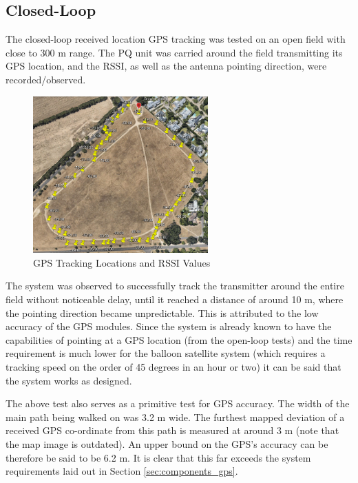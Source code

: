 \subsection{Closed-Loop}\label{sec:closed_loop_testing}
The closed-loop received location GPS tracking was tested on an open field with close to 300 m range. The PQ unit was carried around the field transmitting its GPS location, and the RSSI, as well as the antenna pointing direction, were recorded/observed.

\begin{figure}[!htb]
  \centering
  \includegraphics[width=0.6\textwidth]{gpsTrackingMap}
  \caption{GPS Tracking Locations and RSSI Values}
  \label{fig:gpsTrackingMap}
\end{figure}

The system was observed to successfully track the transmitter around the entire field without noticeable delay, until it reached a distance of around 10 m, where the pointing direction became unpredictable. This is attributed to the low accuracy of the GPS modules. Since the system is already known to have the capabilities of pointing at a GPS location (from the open-loop tests) and the time requirement is much lower for the balloon satellite system (which requires a tracking speed on the order of 45 degrees in an hour or two) it can be said that the system works as designed.

The above test also serves as a primitive test for GPS accuracy. The width of the main path being walked on was 3.2 m wide. The furthest mapped deviation of a received GPS co-ordinate from this path is measured at around 3 m (note that the map image is outdated). An upper bound on the GPS's accuracy can be therefore be said to be 6.2 m. It is clear that this far exceeds the system requirements laid out in Section \ref{sec:components_gps}.